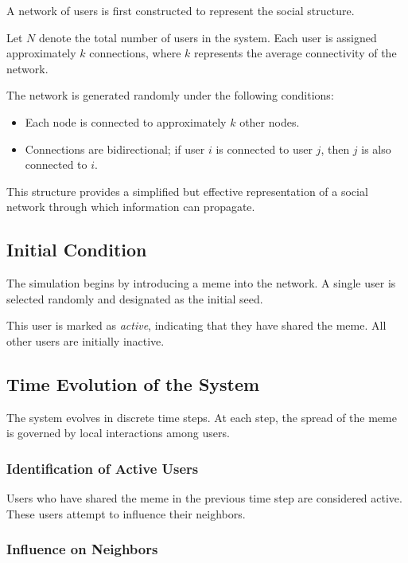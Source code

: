 \documentclass[12pt]{article}
\begin{document}
A network of users is first constructed to represent the social structure.

Let $N$ denote the total number of users in the system. Each user is assigned approximately $k$ connections, where $k$ represents the average connectivity of the network.

The network is generated randomly under the following conditions:
\begin{itemize}
    \item Each node is connected to approximately $k$ other nodes.
    \item Connections are bidirectional; if user $i$ is connected to user $j$, then $j$ is also connected to $i$.
\end{itemize}

This structure provides a simplified but effective representation of a social network through which information can propagate.

\subsection{Initial Condition}

The simulation begins by introducing a meme into the network. A single user is selected randomly and designated as the initial seed.

This user is marked as \textit{active}, indicating that they have shared the meme. All other users are initially inactive.

\subsection{Time Evolution of the System}

The system evolves in discrete time steps. At each step, the spread of the meme is governed by local interactions among users.

\subsubsection{Identification of Active Users}

Users who have shared the meme in the previous time step are considered active. These users attempt to influence their neighbors.

\subsubsection{Influence on Neighbors}
\end{document}
